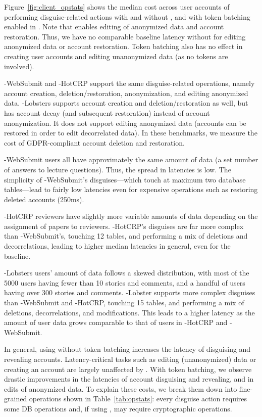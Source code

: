%
Figure~\ref{fig:client_opstats} shows the median cost across user accounts of performing disguise-related actions with and
without \sys, and with token batching enabled in \sys. 
Note that \sys enables editing of anonymized data and account restoration. Thus, we have no
comparable baseline latency without \sys for editing anonymized data or account restoration. 
Token batching also has no effect in creating user accounts and editing unanonymized data (as no
tokens are involved).

\sys-WebSubmit and \sys-HotCRP support the same disguise-related operations, namely
account creation, deletion/restoration, anonymization, and editing anonymized data.
\sys-Lobsters supports account creation and deletion/restoration as well, but has account decay (and
subsequent restoration) instead of account anonymization.  It does not support editing anonymized
data (accounts can be restored in order to edit decorrelated data). In these benchmarks, we measure
the cost of GDPR-compliant account deletion and restoration.

\sys-WebSubmit users all have approximately the same amount of data (a set number of answers to
lecture questions). Thus, the spread in latencies is low. The simplicity of \sys-WebSubmit's
disguises---which touch at maximum two database tables---lead to fairly low latencies even for
expensive operations such as restoring deleted accounts (250ms).

\sys-HotCRP reviewers have slightly more variable amounts of data  depending on the
assignment of papers to reviewers. \sys-HotCRP's disguises are far more complex than
\sys-WebSubmit's, touching 12 tables, and performing a mix of deletions and
decorrelations, leading to higher median latencies in general, even for the baseline.

\sys-Lobsters users' amount of data follows a skewed distribution, with most of the 5000 users
having fewer than 10 stories and comments, and a handful of users having over 300 stories and
comments. \sys-Lobster supports more complex disguises than \sys-WebSubmit and \sys-HotCRP,
touching 15 tables, and performing a mix of deletions, decorrelations, and modifications. This leads
to a higher latency as the amount of user data grows comparable to that of users in \sys-HotCRP and
\sys-WebSubmit.

In general, using \sys without token batching increases the latency of
disguising and revealing accounts. Latency-critical tasks such as editing (unanonymized) data or
creating an account are largely unaffected by \sys. With token batching, we observe drastic
improvements in the latencies of account disguising and revealing, and in edits of anonymized data.
%
To explain these costs, we break them down into fine-grained operations shown in
Table~\ref{tab:opstats}: every disguise action requires some DB operations and,
if using \sys, may require cryptographic operations.

